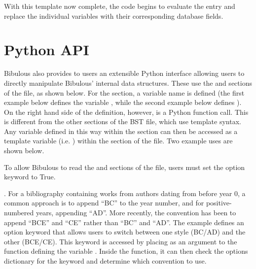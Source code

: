 \documentclass[letterpaper,10pt,english]{sphinxmanual}
\begin{document}
With this template now complete, the code begins to evaluate the entry and replace the individual variables with their corresponding database fields.


\section{Python API}
\label{\detokenize{guidelines_for_writing_style_templates:python-api}}
Bibulous also provides to users an extensible Python interface allowing users to directly manipulate Bibulous’ internal data structures. These use the  and  sections of the file, as shown below. For the  section, a variable name is defined (the first example below defines the variable , while the second example below defines ). On the right hand side of the definition, however, is a Python function call. This is different from the other sections of the BST file, which use template syntax. Any variable defined in this way within the  section can then be accessed as a template variable (i.e. ) within the  section of the file. Two example uses are shown below.

To allow Bibulous to read the  and  sections of the file, users must set the option keyword  to True.

. For a bibliography containing works from authors dating from before year 0, a common approach is to append “BC” to the year number, and for positive-numbered years, appending “AD”. More recently, the convention has been to append “BCE” and “CE” rather than “BC” and “AD”. The example defines an option keyword  that allows users to switch between one style (BC/AD) and the other (BCE/CE). This keyword is accessed by placing  as an argument to the  function defining the variable . Inside the function, it can then check the options dictionary for the  keyword and determine which convention to use.
\end{document}
